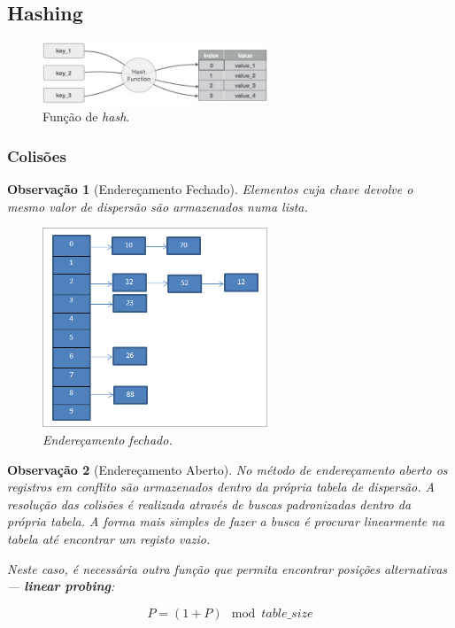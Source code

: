 \documentclass[a4paper, 12pt]{article}
\newtheorem{remark}{Observação}
\begin{document}
\subsection{Hashing}
\begin{figure}[H]
    \centering
    \includegraphics[width=0.6\textwidth]{fig/hash/hash_function.jpg}
    \caption{Função de \emph{hash}.}
\end{figure}

\subsubsection{Colisões}
\begin{remark}[Endereçamento Fechado]
Elementos cuja chave devolve o mesmo valor de dispersão são armazenados numa lista.

\begin{figure}[H]
    \centering
    \includegraphics[width=0.6\textwidth]{fig/hash/1_m8pm0demNgJnaeN7W9JWew.png}
    \caption{Endereçamento fechado.}
\end{figure}
\end{remark}

\begin{remark}[Endereçamento Aberto]
No método de endereçamento aberto os registros em conflito são armazenados dentro da própria tabela de dispersão. A resolução das colisões é realizada através de buscas padronizadas dentro da própria tabela. A forma mais simples de fazer a busca é procurar linearmente na tabela até encontrar um registo vazio.
    
Neste caso, é necessária outra função que permita encontrar posições alternativas — \textbf{linear probing}:

\begin{equation}
    P=(1+P) \mod{table\_size}
\end{equation}
\end{remark}
\end{document}
